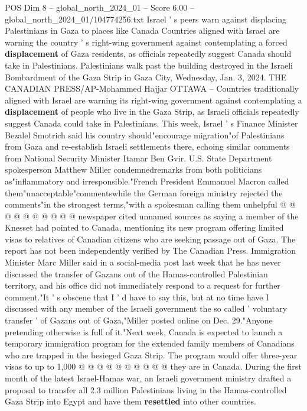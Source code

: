 \begin{textsample}{POS Dim 8 – global\_north\_2024\_01 – Score 6.00 – global\_north\_2024\_01/104774256.txt}  \label{ex:f8_pos_233}
Israel ' s peers warn against displacing Palestinians in Gaza to places like Canada Countries aligned with Israel are warning the country ' s right-wing government against contemplating a forced \textbf{displacement} of Gaza residents, as officials repeatedly suggest Canada should take in Palestinians.
Palestinians walk past the building destroyed in the Israeli Bombardment of the Gaza Strip in Gaza City, Wednesday, Jan. 3, 2024.
THE CANADIAN PRESS/AP-Mohammed Hajjar OTTAWA -- Countries traditionally aligned with Israel are warning its right-wing government against contemplating a \textbf{displacement} of people who live in the Gaza Strip, as Israeli officials repeatedly suggest Canada could take in Palestinians.
This week, Israel ' s Finance Minister Bezalel Smotrich said his country should"encourage migration"of Palestinians from Gaza and re-establish Israeli settlements there, echoing similar comments from National Security Minister Itamar Ben Gvir.
U.S.
State Department spokesperson Matthew Miller condemnedremarks from both politicians as"inflammatory and irresponsible."French President Emmanuel Macron called them"unacceptable"commentswhile the German foreign ministry rejected the comments"in the strongest terms,"with a spokesman calling them unhelpful @ @ @ @ @ @ @ @ @ @ newspaper cited unnamed sources as saying a member of the Knesset had pointed to Canada, mentioning its new program offering limited visas to relatives of Canadian citizens who are seeking passage out of Gaza.
The report has not been independently verified by The Canadian Press.
Immigration Minister Marc Miller said in a social-media post last week that he has never discussed the transfer of Gazans out of the Hamas-controlled Palestinian territory, and his office did not immediately respond to a request for further comment."It ' s obscene that I ' d have to say this, but at no time have I discussed with any member of the Israeli government the so called ' voluntary transfer ' of Gazans out of Gaza,"Miller posted online on Dec. 29."Anyone pretending otherwise is full of it."Next week, Canada is expected to launch a temporary immigration program for the extended family members of Canadians who are trapped in the besieged Gaza Strip.
The program would offer three-year visas to up to 1,000 @ @ @ @ @ @ @ @ @ @ they are in Canada.
During the first month of the latest Israel-Hamas war, an Israeli government ministry drafted a proposal to transfer all 2.3 million Palestinians living in the Hamas-controlled Gaza Strip into Egypt and have them \textbf{resettled} into other countries.

\end{textsample}
